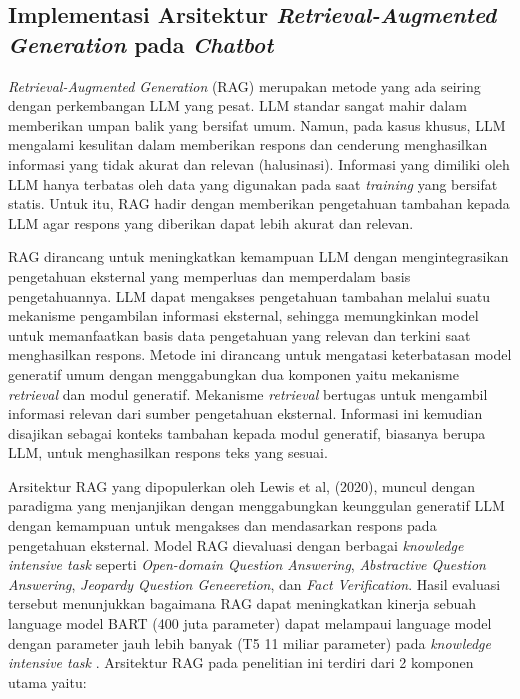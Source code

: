 \subsection{Implementasi Arsitektur \textit{Retrieval-Augmented Generation} pada \textit{Chatbot}}
\textit{Retrieval-Augmented Generation} (RAG) merupakan metode yang ada seiring dengan perkembangan LLM yang pesat.
LLM standar sangat mahir dalam memberikan umpan balik yang bersifat umum.
Namun, pada kasus khusus, LLM mengalami kesulitan dalam memberikan respons dan cenderung menghasilkan informasi yang tidak akurat dan relevan (halusinasi).
Informasi yang dimiliki oleh LLM hanya terbatas oleh data yang digunakan pada saat \textit{training} yang bersifat statis.
Untuk itu, RAG hadir dengan memberikan pengetahuan tambahan kepada LLM agar respons yang diberikan dapat lebih akurat dan relevan.

RAG dirancang untuk meningkatkan kemampuan LLM dengan mengintegrasikan pengetahuan eksternal yang memperluas dan memperdalam basis pengetahuannya.
LLM dapat mengakses pengetahuan tambahan melalui suatu mekanisme pengambilan informasi eksternal, sehingga memungkinkan model untuk memanfaatkan basis data pengetahuan yang relevan dan terkini saat menghasilkan respons.
Metode ini dirancang untuk mengatasi keterbatasan model generatif umum dengan menggabungkan dua komponen yaitu mekanisme \textit{retrieval} dan modul generatif.
Mekanisme \textit{retrieval} bertugas untuk mengambil informasi relevan dari sumber pengetahuan eksternal.
Informasi ini kemudian disajikan sebagai konteks tambahan kepada modul generatif, biasanya berupa LLM, untuk menghasilkan respons teks yang sesuai.

Arsitektur RAG yang dipopulerkan oleh Lewis et al, (2020), muncul dengan paradigma yang menjanjikan dengan menggabungkan keunggulan generatif LLM dengan kemampuan untuk mengakses dan mendasarkan respons pada pengetahuan eksternal.
Model RAG dievaluasi dengan berbagai \textit{knowledge intensive task} seperti \textit{Open-domain Question Answering}, \textit{Abstractive Question Answering}, \textit{Jeopardy Question Geneeretion}, dan \textit{Fact Verification}.
Hasil evaluasi tersebut menunjukkan bagaimana RAG dapat meningkatkan kinerja sebuah language model BART (400 juta parameter) dapat melampaui language model dengan parameter jauh lebih banyak (T5 11 miliar parameter) pada \textit{knowledge intensive task} \cite{Lewis2021RAGKnowledgeIntensiveNLP}.
Arsitektur RAG pada penelitian ini terdiri dari 2 komponen utama yaitu:

